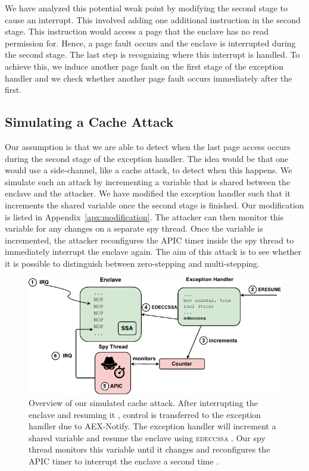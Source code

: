 \documentclass{llncs}
\begin{document}
We have analyzed this potential weak point by modifying the second stage to
cause an interrupt.
This involved adding one additional instruction in the second stage.
This instruction would access a page that the enclave has no read permission for.
Hence, a page fault occurs and the enclave is interrupted during the second stage.
The last step is recognizing where this interrupt is handled.
To achieve this, we induce another page fault on the first stage of the exception handler
and we check whether another page fault occurs immediately after the first.

\subsection{Simulating a Cache Attack}

Our assumption is that we are able to detect when the last page access occurs
during the second stage of the exception handler.
The idea would be that one would use a side-channel, like a cache attack, to
detect when this happens.
We simulate such an attack by incrementing a variable that is shared between
the enclave and the attacker.
We have modified the exception handler such that it increments the shared
variable once the second stage is finished.
Our modification is listed in Appendix~\ref{apx:modification}.
The attacker can then monitor this variable for any changes on a separate spy thread.
Once the variable is incremented, the attacker reconfigures the APIC timer
inside the spy thread to immediately interrupt the enclave again.
The aim of this attack is to see whether it is possible to distinguish between
zero-stepping and multi-stepping.

\begin{figure}[t]
  \includegraphics{images/cache-attack.pdf}
  \caption{Overview of our simulated cache attack.
    After interrupting the enclave  and resuming it ,
    control is transferred to the exception handler due to AEX-Notify.
    The exception handler will increment a shared variable 
    and resume the enclave using \textsc{edeccssa} .
    Our spy thread monitors this variable until it changes and reconfigures
    the APIC timer  to interrupt the enclave a second time .}
\end{figure}
\end{document}

